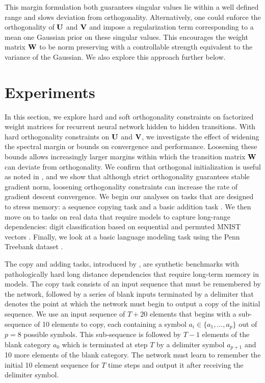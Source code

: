\documentclass{article} %
\begin{document}
This margin formulation both guarantees singular values lie within a well defined range and slows deviation from orthogonality. Alternatively, one could enforce the orthogonality of $\bf{U}$ and $\bf{V}$ and impose a regularization term corresponding to a mean one Gaussian prior on these singular values. This encourages the weight matrix $\bf{W}$ to be norm preserving with a controllable strength equivalent to the variance of the Gaussian.  We also explore this approach further below.

\section{Experiments}

In this section, we explore hard and soft orthogonality constraints on factorized weight matrices for recurrent neural network hidden to hidden transitions. With hard orthogonality constraints on $\bf{U}$ and $\bf{V}$, we investigate the effect of widening the spectral margin or bounds on convergence and performance. Loosening these bounds allows increasingly larger margins within which the transition matrix $\bf{W}$ can deviate from orthogonality. We confirm that orthogonal initialization is useful as noted in \citet{henaff2016orthogonal}, and we show that although strict orthogonality guarantees stable gradient norm, loosening orthogonality constraints can increase the rate of gradient descent convergence. We begin our analyses on tasks that are designed to stress memory: a sequence copying task and a basic addition task \citep{hochreiter1997long}. We then move on to tasks on real data that require models to capture long-range dependencies: digit classification based on sequential and permuted MNIST vectors \citep{le2015simple,lecun1998gradient}. Finally, we look at a basic language modeling task using the Penn Treebank dataset \citep{marcus1993building}.

The copy and adding tasks, introduced by \citet{hochreiter1997long}, are synthetic benchmarks with pathologically hard long distance dependencies that require long-term memory in models. The copy task consists of an input sequence that must be remembered by the network, followed by a series of blank inputs terminated by a delimiter that denotes the point at which the network must begin to output a copy of the initial sequence. We use an input sequence of ${\mathit{T}+20}$ elements that begins with a sub-sequence of 10 elements to copy, each containing a symbol ${\mathit{a_i \in \{a_1, ..., a_p\}}}$ out of ${\mathit{p=8}}$ possible symbols. This sub-sequence is followed by ${\mathit{T}-1}$ elements of the blank category ${\mathit{a_0}}$ which is terminated at step ${\mathit{T}}$ by a delimiter symbol ${\mathit{a_{p+1}}}$ and 10 more elements of the blank category. The network must learn to remember the initial 10 element sequence for ${\mathit{T}}$ time steps and output it after receiving the delimiter symbol.
\end{document}
